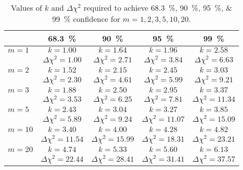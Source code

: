 \documentclass[a4paper]{article}
\begin{document}
    \begin{table}[ht]
        \centering
        \begin{tabular}{lcccc}\hline\hline
            & \SI{68.3}{\percent} & \SI{90}{\percent} & \SI{95}{\percent} & \SI{99}{\percent}\\\hline\hline
            \(m = 1\) & \(k = 1.00\) & \(k = 1.64\) & \(k = 1.96\) & \(k = 2.58\)\\
            & \(\Delta\chi^2 = 1.00\) & \(\Delta\chi^2 = 2.71\) & \(\Delta\chi^2 = 3.84\) & \(\Delta\chi^2 = 6.63\)\\\hline
            
            \(m = 2\) & \(k = 1.52\) & \(k = 2.15\) & \(k = 2.45\) & \(k = 3.03\)\\
            & \(\Delta\chi^2 = 2.30\) & \(\Delta\chi^2 = 4.61\) & \(\Delta\chi^2 = 5.99\) & \(\Delta\chi^2 = 9.21\)\\\hline
            
            \(m = 3\) & \(k = 1.88\) & \(k = 2.50\) & \(k = 2.95\) & \(k = 3.37\)\\
            & \(\Delta\chi^2 = 3.53\) & \(\Delta\chi^2 = 6.25\) & \(\Delta\chi^2 = 7.81\) & \(\Delta\chi^2 = 11.34\)\\\hline
            
            \(m = 5\) & \(k = 2.43\) & \(k = 3.04\) & \(k = 3.27\) & \(k = 3.85\)\\
            & \(\Delta\chi^2 = 5.89\) & \(\Delta\chi^2 = 9.24\) & \(\Delta\chi^2 = 11.07\) & \(\Delta\chi^2 = 15.09\)\\\hline
            
            \(m = 10\) & \(k = 3.40\) & \(k = 4.00\) & \(k = 4.28\) & \(k = 4.82\)\\
            & \(\Delta\chi^2 = 11.54\) & \(\Delta\chi^2 = 15.99\) & \(\Delta\chi^2 = 18.31\) & \(\Delta\chi^2 = 23.21\)\\\hline
            
            \(m = 20\) & \(k = 4.74\) & \(k = 5.33\) & \(k = 5.60\) & \(k = 6.13\)\\
            & \(\Delta\chi^2 = 22.44\) & \(\Delta\chi^2 = 28.41\) & \(\Delta\chi^2 = 31.41\) & \(\Delta\chi^2 = 37.57\)\\\hline\hline
        \end{tabular}
        \caption{Values of \(k\) and \(\Delta\chi^2\) required to achieve \SIlist{68.3;90;95;99}{\percent} confidence for \(m = 1, 2, 3, 5, 10, 20\).}
        \label{tab:multiparameter CI}
    \end{table}
\end{document}

